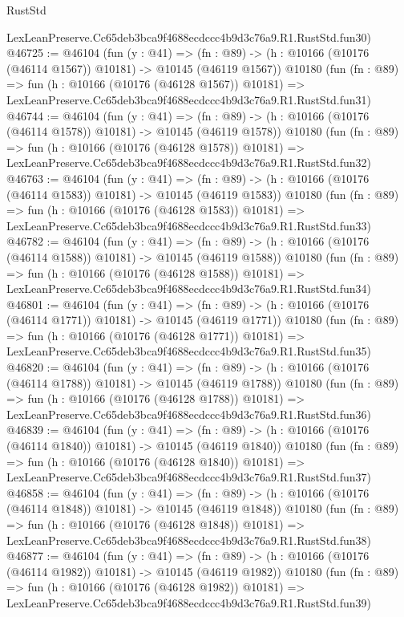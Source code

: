 \begin{lexlean}{RustStd}
\begin{coremodule}
    LexLeanPreserve.Cc65deb3bca9f4688ecdccc4b9d3c76a9.R1.RustStd.fun30)
@46725 := @46104
    (fun (y : @41) =>
    (fn : @89) -> (h : @10166 (@10176 (@46114 @1567)) @10181) -> @10145 (@46119 @1567))
    @10180
    (fun (fn : @89) =>
    fun (h : @10166 (@10176 (@46128 @1567)) @10181) =>
    LexLeanPreserve.Cc65deb3bca9f4688ecdccc4b9d3c76a9.R1.RustStd.fun31)
@46744 := @46104
    (fun (y : @41) =>
    (fn : @89) -> (h : @10166 (@10176 (@46114 @1578)) @10181) -> @10145 (@46119 @1578))
    @10180
    (fun (fn : @89) =>
    fun (h : @10166 (@10176 (@46128 @1578)) @10181) =>
    LexLeanPreserve.Cc65deb3bca9f4688ecdccc4b9d3c76a9.R1.RustStd.fun32)
@46763 := @46104
    (fun (y : @41) =>
    (fn : @89) -> (h : @10166 (@10176 (@46114 @1583)) @10181) -> @10145 (@46119 @1583))
    @10180
    (fun (fn : @89) =>
    fun (h : @10166 (@10176 (@46128 @1583)) @10181) =>
    LexLeanPreserve.Cc65deb3bca9f4688ecdccc4b9d3c76a9.R1.RustStd.fun33)
@46782 := @46104
    (fun (y : @41) =>
    (fn : @89) -> (h : @10166 (@10176 (@46114 @1588)) @10181) -> @10145 (@46119 @1588))
    @10180
    (fun (fn : @89) =>
    fun (h : @10166 (@10176 (@46128 @1588)) @10181) =>
    LexLeanPreserve.Cc65deb3bca9f4688ecdccc4b9d3c76a9.R1.RustStd.fun34)
@46801 := @46104
    (fun (y : @41) =>
    (fn : @89) -> (h : @10166 (@10176 (@46114 @1771)) @10181) -> @10145 (@46119 @1771))
    @10180
    (fun (fn : @89) =>
    fun (h : @10166 (@10176 (@46128 @1771)) @10181) =>
    LexLeanPreserve.Cc65deb3bca9f4688ecdccc4b9d3c76a9.R1.RustStd.fun35)
@46820 := @46104
    (fun (y : @41) =>
    (fn : @89) -> (h : @10166 (@10176 (@46114 @1788)) @10181) -> @10145 (@46119 @1788))
    @10180
    (fun (fn : @89) =>
    fun (h : @10166 (@10176 (@46128 @1788)) @10181) =>
    LexLeanPreserve.Cc65deb3bca9f4688ecdccc4b9d3c76a9.R1.RustStd.fun36)
@46839 := @46104
    (fun (y : @41) =>
    (fn : @89) -> (h : @10166 (@10176 (@46114 @1840)) @10181) -> @10145 (@46119 @1840))
    @10180
    (fun (fn : @89) =>
    fun (h : @10166 (@10176 (@46128 @1840)) @10181) =>
    LexLeanPreserve.Cc65deb3bca9f4688ecdccc4b9d3c76a9.R1.RustStd.fun37)
@46858 := @46104
    (fun (y : @41) =>
    (fn : @89) -> (h : @10166 (@10176 (@46114 @1848)) @10181) -> @10145 (@46119 @1848))
    @10180
    (fun (fn : @89) =>
    fun (h : @10166 (@10176 (@46128 @1848)) @10181) =>
    LexLeanPreserve.Cc65deb3bca9f4688ecdccc4b9d3c76a9.R1.RustStd.fun38)
@46877 := @46104
    (fun (y : @41) =>
    (fn : @89) -> (h : @10166 (@10176 (@46114 @1982)) @10181) -> @10145 (@46119 @1982))
    @10180
    (fun (fn : @89) =>
    fun (h : @10166 (@10176 (@46128 @1982)) @10181) =>
    LexLeanPreserve.Cc65deb3bca9f4688ecdccc4b9d3c76a9.R1.RustStd.fun39)

\end{coremodule}
\end{lexlean}
